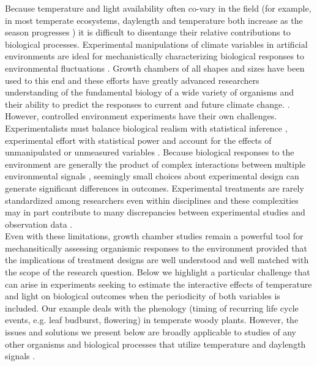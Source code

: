 \documentclass[11pt]{article}
\begin{document}
\noindent Because temperature and light availability often co-vary in the field (for example, in most temperate ecosystems, daylength and temperature both increase as the season progresses \citep{}) it is difficult to disentange their relative contributions to biological processes. Experimental manipulations of climate variables in artificial environments are ideal for mechanistically characterizing biological responses to environmental fluctuations \citep{Ettinger_inprep,Primack2015}. Growth chambers of all shapes and sizes have been used to this end \citep{} and these efforts have greatly advanced researchers understanding of the fundamental biology of a wide variety of organisms and their ability to predict the responses to current and future climate change. \citep{}.\\ 

However, controlled environment experiments have their own challenges. Experimentalists must balance biological realism with statistical inference \citep{}, experimental effort with statistical power \citep{} and account for the effects of unmanipulated or unmeasured variables \citep{}. Because biological responses to the environment are generally the product of complex interactions between multiple environmental signals \citep{}, seemingly small choices about experimental design can generate significant differences in outcomes. Experimental treatments are rarely standardized among researchers even within disciplines \citep{} and these complexities may in part contribute to many discrepancies between experimental studies and observation data \citep{Poorter:2016aa}.\\

\noindent Even with these limitations, growth chamber studies remain a powerful tool for mechansitically assessing organismic responses to the environment provided that the implications of  treatment designs are well understood and well matched with the scope of the research question. Below we highlight a particular challenge that can arise in experiments seeking to estimate the interactive effects of temperature and light on biological outcomes when the periodicity of both variables is included. Our example deals with the phenology (timing of recurring life cycle events, e.g. leaf budburst, flowering) in temperate woody plants. However, the issues and solutions we present below are broadly applicable to studies of any other organisms and biological processes that utilize temperature and daylength signals \citep{}. \\
\end{document}
